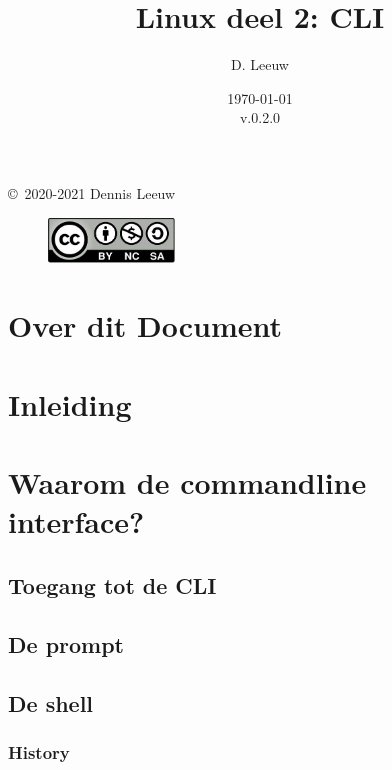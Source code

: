 \documentclass[a4paper,12pt,twoside,openright,titlepage]{book}
\author{D. Leeuw}
\title{Linux deel 2: CLI}
\date{\today\\v.0.2.0}
\begin{document}

\maketitle

\copyright\ 2020-2021 Dennis Leeuw\\

\begin{figure}
\includegraphics[width=0.3\textwidth]{CC-BY-SA-NC.png}
\end{figure}

\bigskip




\frontmatter
\chapter{Over dit Document}



\tableofcontents

\mainmatter
\chapter{Inleiding}


\chapter{Waarom de commandline interface?}

\section{Toegang tot de CLI}

\section{De prompt}

\section{De shell}

\subsection{History}

\end{document}
